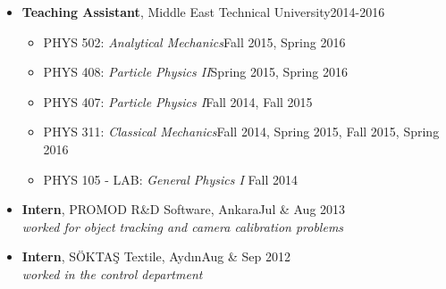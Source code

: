\documentclass[a4paper,11pt]{article}
\begin{document}
\begin{itemize}[noitemsep,nolistsep]
\begin{itemize}
	\end{itemize} 
	\item[] \textbf{Teaching Assistant}, Middle East Technical University\hfill 2014-2016
	\vspace*{-.3em}
	\begin{itemize}
	\item[] PHYS 502: \emph{Analytical Mechanics}\hfill Fall 2015, Spring 2016\hspace*{2.2em}\vspace*{-.3em}
	\item[] PHYS 408: \emph{Particle Physics II}\hfill Spring 2015, Spring 2016\hspace*{2.2em}\vspace*{-.3em}
	\item[] PHYS 407: \emph{Particle Physics I}\hfill Fall 2014, Fall 2015\hspace*{2.2em}\vspace*{-.3em}
	\item[] PHYS 311: \emph{Classical Mechanics}\hfill Fall 2014, Spring 2015, Fall 2015, Spring 2016\hspace*{2.2em}\vspace*{-.3em}
	\item[] PHYS 105 - LAB: \emph{General Physics I} \hfill Fall 2014\hspace*{2.2em}\vspace*{-.3em}
	\end{itemize} 
	\item[] \textbf{Intern}, PROMOD R\&D Software, Ankara\hfill Jul \& Aug 2013\\	\hspace*{1.8em}\emph{worked for object tracking and camera calibration problems}
\vspace*{-.3em}
	\item[] \textbf{Intern}, SÖKTAŞ Textile, Aydın\hfill Aug \& Sep 2012\\	\hspace*{1.8em}\emph{worked in the control department}
\end{itemize}
\end{document}
